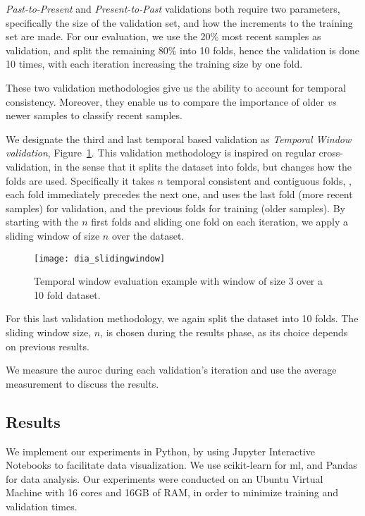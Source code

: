 \textit{Past-to-Present} and \textit{Present-to-Past} validations both require two parameters, specifically the size of the validation set, and how the increments to the training set are made. For our evaluation, we use the 20\% most recent samples as validation, and split the remaining 80\% into 10 folds, hence the validation is done 10 times, with each iteration increasing the training size by one fold.

These two validation methodologies give us the ability to account for temporal consistency. Moreover, they enable us to compare the importance of older \textit{vs} newer samples to classify recent samples.

We designate the third and last temporal based validation as \textit{Temporal Window validation}, Figure~\ref{fig:dia_slidingwindow}. This validation methodology is inspired on regular cross-validation, in the sense that it splits the dataset into folds, but changes how the folds are used. Specifically it takes $n$  temporal consistent and contiguous folds, \ie, each fold immediately precedes the next one, and uses the last fold (more recent samples) for validation, and the previous folds for training (older samples). By starting with the $n$ first folds and sliding one fold on each iteration, we apply a sliding window of size $n$ over the dataset.

\begin{figure}[!h]
	\centering
	\texttt{[image: dia\_slidingwindow]}
	\caption{Temporal window evaluation example with window of size 3 over a 10 fold dataset.}
	\label{fig:dia_slidingwindow}
\end{figure}

For this last validation methodology, we again split the dataset into 10 folds. The sliding window size, $n$, is chosen during the results phase, as its choice depends on previous results.

We measure the \gls{auroc} during each validation's iteration and use the average measurement to discuss the results.

\subsection{Results}
\label{section:single_layer_results}

We implement our experiments in Python, by using Jupyter Interactive Notebooks\cite{tool:jupyter} to facilitate data visualization. We use scikit-learn\cite{tool:sklearn} for \gls{ml}, and Pandas\cite{tool:pandas} for data analysis. Our experiments were conducted on an Ubuntu Virtual Machine with 16 cores and 16GB of RAM, in order to minimize training and validation times.


